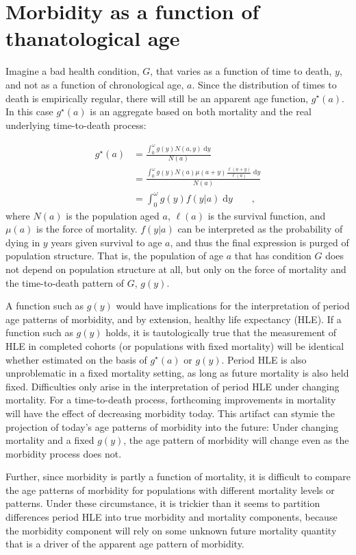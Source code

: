 \documentclass[11pt,oneside,a4paper]{article} %
\newcommand{\dd}{\; \mathrm{d}}
\newcommand{\tc}{\quad\quad\text{,}}
\begin{document}
\section{Morbidity as a function of thanatological age}
 
Imagine a bad health condition, $G$, that varies as a function of time to death,
$y$, and not as a function of chronological age, $a$. Since the distribution of
times to death is empirically regular, there will still be an apparent age
function, $g^\star(a)$.
In this case $g^\star(a)$ is an aggregate based on both mortality and the real underlying time-to-death process:
 
\begin{align}
g^\star(a) &= \frac{\int _0^\omega g(y) N(a,y) \dd y}{N(a)} \\
      &= \frac{\int _0^\omega g(y) N(a)
      \mu(a+y)\frac{\ell(a+y)}{\ell(a)}\dd y}{N(a)}\\
      &= \int _0^\omega g(y) f(y|a)\dd y \tc
\end{align}
where $N(a)$ is the population aged $a$, $\ell(a)$ is the survival function, and
$\mu(a)$ is the force of mortality. $f(y|a)$ can be interpreted as the
probability of dying in $y$ years given survival to age $a$, and thus the final
expression is purged of population structure. That is, the population of age $a$
that has condition $G$ does not depend on population structure at all, but only
on the force of mortality and the time-to-death pattern of $G$, $g(y)$. 

A function such as $g(y)$ would have implications for the interpretation of
period age patterns of morbidity, and by extension, healthy life expectancy
(HLE). If a function such as $g(y)$ holds, it is tautologically true that the
measurement of HLE in completed cohorts (or populations with fixed mortality)
will be identical whether estimated on the basis of $g^\star(a)$ or $g(y)$.
Period HLE is also unproblematic in a fixed mortality setting, as long as future
mortality is also held fixed. Difficulties only arise in the interpretation of
period HLE under changing mortality. For a time-to-death process, forthcoming
improvements in mortality will have the effect of decreasing morbidity today.
This artifact can stymie the projection of today's age patterns of morbidity
into the future: Under changing mortality and a fixed $g(y)$, the age pattern of
morbidity will change even as the morbidity process does not. 

Further, since morbidity is partly a function of mortality, it is difficult to
compare the age patterns of morbidity for populations with different mortality
levels or patterns. Under these circumstance, it is trickier than it seems to
partition differences period HLE into true morbidity and mortality components, because the morbidity component will rely on some unknown future mortality quantity that is a driver of the apparent age pattern of morbidity.
 
\end{document}
